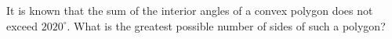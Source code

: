 It is known that the sum of the interior angles of a convex polygon does not exceed $2020^{\circ}$. What is the greatest possible number of sides of such a polygon?
